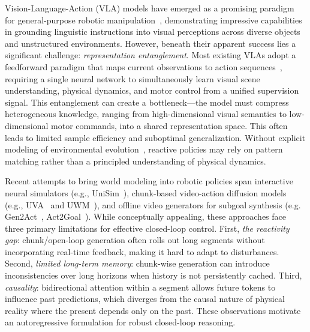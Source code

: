 \documentclass[onecolumn]{robbyant}           %
\begin{document}
Vision-Language-Action (VLA) models have emerged as a promising paradigm for general-purpose robotic manipulation~\cite{rt1,rt2,kim2024,pi0}, demonstrating impressive capabilities in grounding linguistic instructions into visual perceptions across diverse objects and unstructured environments.
However, beneath their apparent success lies a significant challenge: \emph{representation entanglement}.
Most existing VLAs adopt a feedforward paradigm that maps current observations to action sequences~\cite{diffusionpolicy,act}, requiring a single neural network to simultaneously learn visual scene understanding, physical dynamics, and motor control from a unified supervision signal.
This entanglement can create a bottleneck---the model must compress heterogeneous knowledge, ranging from high-dimensional visual semantics to low-dimensional motor commands, into a shared representation space.
This often leads to limited sample efficiency and suboptimal generalization.
Without explicit modeling of environmental evolution~\cite{dreamerv3,daydreamer,tdmpc2}, reactive policies may rely on pattern matching rather than a principled understanding of physical dynamics.

Recent attempts to bring world modeling into robotic policies span interactive neural simulators (e.g., UniSim~\cite{unisim}), chunk-based video-action diffusion models (e.g., UVA~\cite{uva} and UWM~\cite{uwm}), and offline video generators for subgoal synthesis (e.g. Gen2Act~\cite{gen2act}, Act2Goal~\cite{zhou2025act2goal}).
While conceptually appealing, these approaches face three primary limitations for effective closed-loop control.
First, \emph{the reactivity gap}: chunk/open-loop generation often rolls out long segments without incorporating real-time feedback, making it hard to adapt to disturbances.
Second, \emph{limited long-term memory}: chunk-wise generation can introduce inconsistencies over long horizons when history is not persistently cached.
Third, \emph{causality}: bidirectional attention within a segment allows future tokens to influence past predictions, which diverges from the causal nature of physical reality where the present depends only on the past.
These observations motivate an autoregressive formulation for robust closed-loop reasoning.
\end{document}
